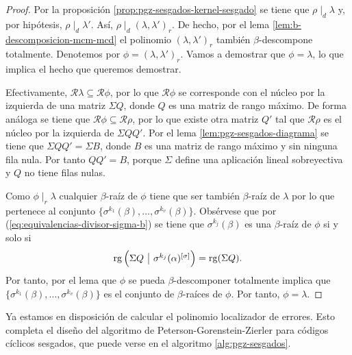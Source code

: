 \begin{proof}
  Por la proposición \ref{prop:pgz-sesgados-kernel-sesgado} se tiene que \(\rho \mid_d \lambda\) y, por hipótesis, \(\rho \mid_d \lambda'\).
  Así, \(\rho \mid_d (\lambda, \lambda')_{r}\).
  De hecho, por el lema \ref{lem:b-descomposicion-mcm-mcd} el polinomio \((\lambda, \lambda')_{r}\) también \(\beta\)-descompone totalmente.
  Denotemos por \(\phi = (\lambda, \lambda')_{r}\).
  Vamos a demostrar que \(\phi = \lambda\), lo que implica el hecho que queremos demostrar.

  Efectivamente, \(\mathcal R \lambda \subseteq \mathcal R\phi\), por lo que \(\mathcal R\phi\) se corresponde con el núcleo por la izquierda de una matriz \(\Sigma Q\), donde \(Q\) es una matriz de rango máximo.
  De forma análoga se tiene que \(\mathcal R\phi \subseteq \mathcal R\rho\), por lo que existe otra matriz \(Q'\) tal que \(\mathcal R\rho\) es el núcleo por la izquierda de \(\Sigma QQ'\).
  Por el lema \ref{lem:pgz-sesgados-diagrama} se tiene que \(\Sigma QQ' = \Sigma B\), donde \(B\) es una matriz de rango máximo y sin ninguna fila nula.
  Por tanto \(QQ' = B\), porque \(\Sigma\) define una aplicación lineal sobreyectiva y \(Q\) no tiene filas nulas.

  Como \(\phi \mid_r \lambda\) cualquier \(\beta\)-raíz de \(\phi\) tiene que ser también \(\beta\)-raíz de \(\lambda\) por lo que pertenece al conjunto \(\{\sigma^{k_1}(\beta), \dots, \sigma^{k_v}(\beta)\}\).
  Obsérvese que por (\ref{eq:equivalencias-divisor-sigma-b}) se tiene que \(\sigma^{k_j}(\beta)\) es una \(\beta\)-raíz de \(\phi\) si y solo si
  \[
    \rank\left( \begin{array}{@{}c|c@{}}
      \Sigma Q & \sigma^{k_j}(\alpha)^{[\sigma]}
    \end{array}\right) = \rank(\Sigma Q).
  \]
  Por tanto, por el lema \parencite[Lema 2.3]{gomez-torrecillas_petersongorensteinzierler_2018} que \(\phi\) se pueda \(\beta\)-descomponer totalmente implica que \(\{\sigma^{k_1}(\beta), \dots, \sigma^{k_v}(\beta)\}\) es el conjunto de \(\beta\)-raíces de \(\phi\).
  Por tanto, \(\phi = \lambda\).
\end{proof}

Ya estamos en disposición de calcular el polinomio localizador de errores.
Esto completa el diseño del algoritmo de Peterson-Gorenstein-Zierler para códigos cíclicos sesgados, que puede verse en el algoritmo \ref{alg:pgz-sesgados}.

